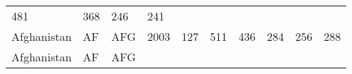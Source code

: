 \documentclass[]{article}
\begin{document}
\begin{longtable}[]{@{}llllllllll@{}}
\begin{minipage}[t]{0.09\columnwidth}
481\strut
\end{minipage} & \begin{minipage}[t]{0.09\columnwidth}\raggedright
368\strut
\end{minipage} & \begin{minipage}[t]{0.09\columnwidth}\raggedright
246\strut
\end{minipage} & \begin{minipage}[t]{0.09\columnwidth}\raggedright
241\strut
\end{minipage}\tabularnewline
\begin{minipage}[t]{0.08\columnwidth}\raggedright
Afghanistan\strut
\end{minipage} & \begin{minipage}[t]{0.04\columnwidth}\raggedright
AF\strut
\end{minipage} & \begin{minipage}[t]{0.04\columnwidth}\raggedright
AFG\strut
\end{minipage} & \begin{minipage}[t]{0.04\columnwidth}\raggedright
2003\strut
\end{minipage} & \begin{minipage}[t]{0.08\columnwidth}\raggedright
127\strut
\end{minipage} & \begin{minipage}[t]{0.09\columnwidth}\raggedright
511\strut
\end{minipage} & \begin{minipage}[t]{0.09\columnwidth}\raggedright
436\strut
\end{minipage} & \begin{minipage}[t]{0.09\columnwidth}\raggedright
284\strut
\end{minipage} & \begin{minipage}[t]{0.09\columnwidth}\raggedright
256\strut
\end{minipage} & \begin{minipage}[t]{0.09\columnwidth}\raggedright
288\strut
\end{minipage}\tabularnewline
\begin{minipage}[t]{0.08\columnwidth}\raggedright
Afghanistan\strut
\end{minipage} & \begin{minipage}[t]{0.04\columnwidth}\raggedright
AF\strut
\end{minipage} & \begin{minipage}[t]{0.04\columnwidth}\raggedright
AFG\strut
\end{minipage} & \begin{minipage}[t]{0.04\columnwidth}\raggedright

\end{minipage}
\end{longtable}
\end{document}
